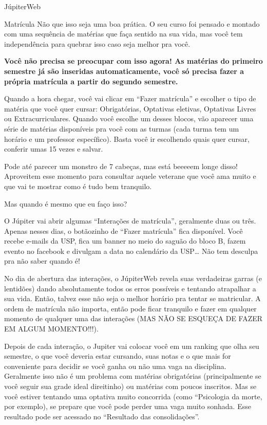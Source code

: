 \begin{secao}{JúpiterWeb}
\begin{subsecao}{Matrícula}
Não que isso seja uma boa prática. O seu curso foi pensado e montado com uma
sequência de matérias que faça sentido na sua vida, mas você tem independência
para quebrar isso caso seja melhor pra você.

\textbf{Você não precisa se preocupar com isso agora! As matérias do primeiro
semestre já são inseridas automaticamente, você só precisa fazer a própria
matrícula a partir do segundo semestre.}

Quando a hora chegar, você vai clicar em “Fazer matrícula” e escolher o tipo de
matéria que você quer cursar: Obrigatórias, Optativas eletivas, Optativas
Livres ou Extracurriculares. Quando você escolhe um desses blocos, vão aparecer
uma série de matérias disponíveis pra você com as turmas (cada turma tem um
horário e um professor específico). Basta você ir escolhendo quais quer cursar,
conferir umas 15 vezes e salvar.

Pode até parecer um monstro de 7 cabeças, mas está beeeeem longe disso!
Aproveitem esse momento para consultar aquele veterane que você ama muito e que
vai te mostrar como é tudo bem tranquilo.

Mas quando é mesmo que eu faço isso?

O Júpiter vai abrir algumas “Interações de matrícula”, geralmente duas ou três.
Apenas nesses dias, o botãozinho de “Fazer matrícula” fica disponível. Você
recebe e-mails da USP, fica um banner no meio do saguão do bloco B, fazem
evento no facebook e divulgam a data no calendário da USP… Não tem desculpa pra
não saber quando é!

No dia de abertura das interações, o JúpiterWeb revela suas verdadeiras garras
(e lentidões) dando absolutamente todos os erros possíveis e tentando
atrapalhar a sua vida. Então, talvez esse não seja o melhor horário pra tentar
se matricular. A ordem de matrícula não importa, então pode ficar tranquilo e
fazer em qualquer momento de qualquer uma das interações (MAS NÃO SE ESQUEÇA DE
FAZER EM ALGUM MOMENTO!!!).

Depois de cada interação, o Jupiter vai colocar você em um ranking que olha seu
semestre, o que você deveria estar cursando, suas notas e o que mais for
conveniente para decidir se você ganha ou não uma vaga na disciplina.
Geralmente isso não é um problema com matérias obrigatórias (principalmente se
você seguir sua grade ideal direitinho) ou matérias com poucos inscritos. Mas
se você estiver tentando uma optativa muito concorrida (como “Psicologia da
morte, por exemplo), se prepare que você pode perder uma vaga muito sonhada.
Esse resultado pode ser acessado no “Resultado das consolidações”.


\end{subsecao}
\end{secao}
